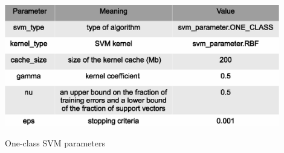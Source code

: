 \begin{table}[h]
  \centering
  \includegraphics [width=0.9\textwidth]{images/svm_parameters}
  \caption{One-class SVM parameters}
  \label{fig:svm_parameters}
\end{table}







 	

 
 
